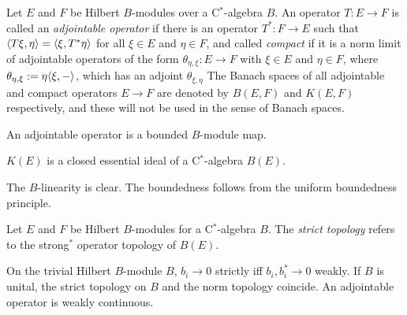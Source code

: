 \documentclass{../../large}
\begin{document}
\begin{prb}
Let $E$ and $F$ be Hilbert $B$-modules over a C$^*$-algebra $B$.
An operator $T:E\to F$ is called an \emph{adjointable operator} if there is an operator $T^*:F\to E$ such that $\langle T\xi,\eta\rangle=\langle\xi,T^*\eta\rangle$ for all $\xi\in E$ and $\eta\in F$, and called \emph{compact} if it is a norm limit of adjointable operators of the form $\theta_{\eta,\xi}:E\to F$ with $\xi\in E$ and $\eta\in F$, where $\theta_{\eta,\xi}:=\eta\langle\xi,-\rangle$, which has an adjoint $\theta_{\xi,\eta}$
The Banach spaces of all adjointable and compact operators $E\to F$ are denoted by $B(E,F)$ and $K(E,F)$ respectively, and these will not be used in the sense of Banach spaces.
\begin{parts}
\item An adjointable operator is a bounded $B$-module map.
\item $K(E)$ is a closed essential ideal of a C$^*$-algebra $B(E)$.
\item
\end{parts}
\end{prb}
\begin{pf}
The $B$-linearity is clear.
The boundedness follows from the uniform boundedness principle.

\end{pf}


\begin{prb}
Let $E$ and $F$ be Hilbert $B$-modules for a C$^*$-algebra $B$.
The \emph{strict topology} refers to the strong$^*$ operator topology of $B(E)$.



On the trivial Hilbert $B$-module $B$, $b_i\to0$ strictly iff $b_i,b_i^*\to0$ weakly.
If $B$ is unital, the strict topology on $B$ and the norm topology coincide.
An adjointable operator is weakly continuous.





\end{prb}
\end{document}
